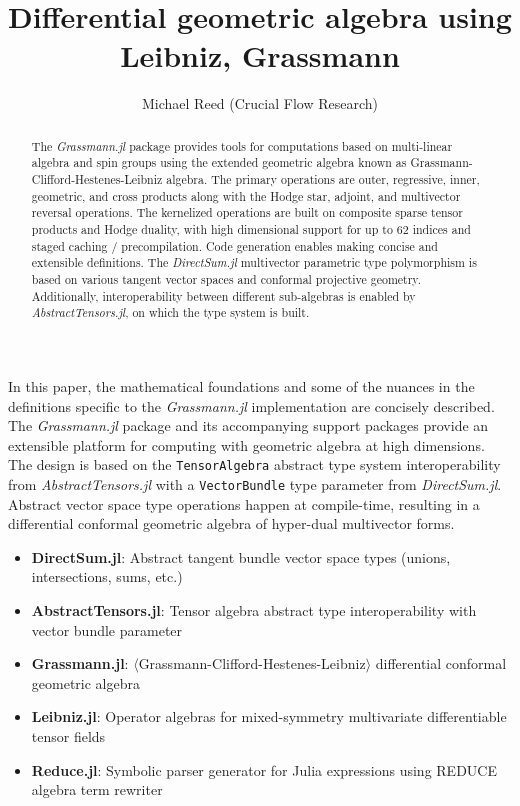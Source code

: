 \documentclass[]{article}
\author{Michael Reed (Crucial Flow Research)}
\title{Differential geometric algebra using Leibniz, Grassmann}
\theoremstyle{definition}
\theoremstyle{remark}
\begin{document}
%

\maketitle

\begin{abstract}
	The \textit{Grassmann.jl}
	package provides tools for computations based on multi-linear algebra and spin groups using the extended geometric algebra known as Grassmann-Clifford-Hestenes-Leibniz algebra.
	The primary operations are
	outer, regressive, inner, geometric, and cross products along with the Hodge star, adjoint, and multivector reversal operations. 
	The kernelized operations are built on composite sparse tensor products and Hodge duality, with high dimensional support for up to 62 indices and staged caching / precompilation. Code generation enables making concise and extensible definitions.
	The \textit{DirectSum.jl}
	multivector parametric type polymorphism is based on various tangent vector spaces and conformal projective geometry.
	Additionally, interoperability between different sub-algebras is enabled by \textit{AbstractTensors.jl},
	on which the type system is built.
\end{abstract}

In this paper, the mathematical foundations and some of the nuances in the definitions specific to the \textit{Grassmann.jl} implementation are concisely described.
The \textit{Grassmann.jl} package and its accompanying support packages provide an extensible platform for computing with geometric algebra at high dimensions. 
The design is based on the \verb`TensorAlgebra` abstract type system interoperability from \textit{AbstractTensors.jl} with a \verb`VectorBundle` type parameter from \textit{DirectSum.jl}. Abstract vector space type operations happen at compile-time, resulting in a differential conformal geometric algebra of hyper-dual multivector forms.

\begin{itemize}
	\item \textbf{DirectSum.jl}: Abstract tangent bundle vector space types (unions, intersections, sums, etc.)
	\item \textbf{AbstractTensors.jl}: Tensor algebra abstract type interoperability with vector bundle parameter	
	\item \textbf{Grassmann.jl}: $\langle$Grassmann-Clifford-Hestenes-Leibniz$\rangle$ differential conformal geometric algebra
	\item \textbf{Leibniz.jl}: Operator algebras for mixed-symmetry multivariate differentiable tensor fields
	\item \textbf{Reduce.jl}: Symbolic parser generator for Julia expressions using REDUCE algebra term rewriter
\end{itemize}
\end{document}
